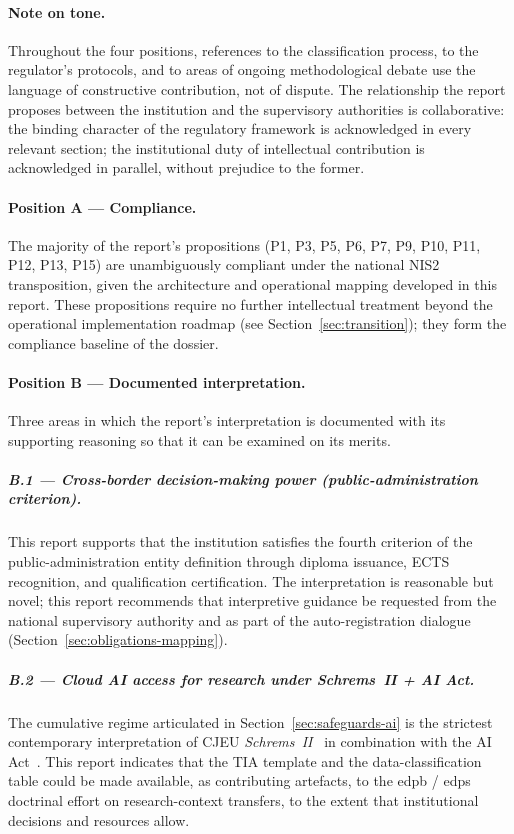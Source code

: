 \paragraph{Note on tone.}
Throughout the four positions, references to the classification
process, to the regulator's protocols, and to areas of ongoing
methodological debate use the language of constructive
contribution, not of dispute. The relationship the report proposes
between the institution and the supervisory authorities is
collaborative: the binding character of the regulatory framework
is acknowledged in every relevant section; the institutional duty
of intellectual contribution is acknowledged in parallel, without
prejudice to the former.

\paragraph{Position A --- Compliance.}
The majority of the report's propositions (P1, P3, P5, P6, P7,
P9, P10, P11, P12, P13, P15) are unambiguously compliant under
the national NIS2 transposition, given the
architecture and operational mapping developed in this report.
These propositions require no further intellectual treatment
beyond the operational implementation roadmap (see
Section~\ref{sec:transition}); they form the compliance baseline
of the dossier.

\paragraph{Position B --- Documented interpretation.}
Three areas in which the report's interpretation is documented
with its supporting reasoning so that it can be examined on its
merits.

\subparagraph{B.1 --- Cross-border decision-making power (public-administration criterion).}
This report supports that the institution satisfies the fourth
criterion of the public-administration entity definition through
diploma issuance, ECTS recognition, and qualification certification.
The interpretation is reasonable but novel; this report recommends
that interpretive guidance be requested from the national supervisory
authority and  as part of the
auto-registration dialogue
(Section~\ref{sec:obligations-mapping}).

\subparagraph{B.2 --- Cloud AI access for research under \emph{Schrems~II} + AI Act.}
The cumulative regime articulated in
Section~\ref{sec:safeguards-ai} is the strictest contemporary
interpretation of CJEU \emph{Schrems~II}~\cite{schrems2020} in
combination with the AI Act~\cite{eu-ai-act}. This report
indicates that the TIA template and the data-classification
table could be made available, as contributing artefacts, to the
\gls{edpb} / \gls{edps} doctrinal effort on research-context transfers, to
the extent that institutional decisions and resources allow.

